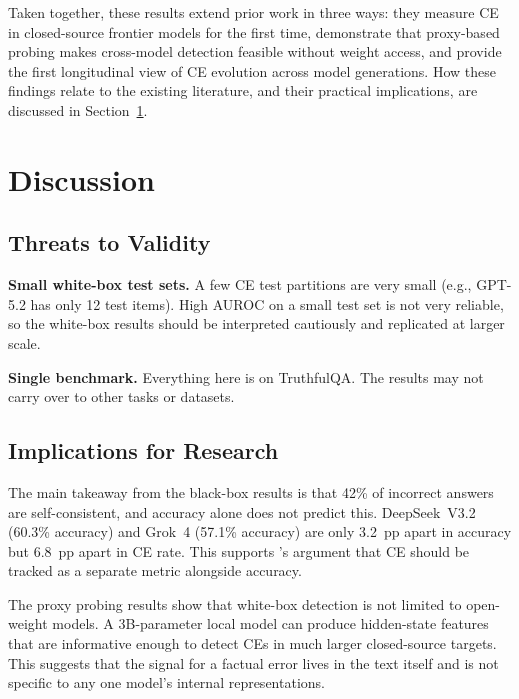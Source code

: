 \documentclass[12pt,twocolumn]{article}
\begin{document}
Taken together, these results extend prior work in three ways: they
measure CE in closed-source frontier models for the first time,
demonstrate that proxy-based probing makes cross-model detection
feasible without weight access, and provide the first longitudinal
view of CE evolution across model generations. How these findings
relate to the existing literature, and their practical implications,
are discussed in Section~\ref{sec:discussion}.

\section{Discussion}
\label{sec:discussion}

\subsection{Threats to Validity}
\label{sec:discussion-threats}

\textbf{Small white-box test sets.} A few CE test partitions are
very small (e.g., GPT-5.2 has only 12 test items). High AUROC on
a small test set is not very reliable, so the white-box results
should be interpreted cautiously and replicated at larger scale.

\textbf{Single benchmark.} Everything here is on TruthfulQA. The
results may not carry over to other tasks or datasets.

\subsection{Implications for Research}
\label{sec:discussion-research}

The main takeaway from the black-box results is that 42\% of
incorrect answers are self-consistent, and accuracy alone does not
predict this. DeepSeek~V3.2 (60.3\% accuracy) and Grok~4 (57.1\%
accuracy) are only 3.2~pp apart in accuracy but 6.8~pp apart in CE
rate. This supports \citet{tan2025consistent}'s argument that CE
should be tracked as a separate metric alongside accuracy.

The proxy probing results show that white-box detection is not
limited to open-weight models. A 3B-parameter local model can
produce hidden-state features that are informative enough to detect
CEs in much larger closed-source targets. This suggests that the
signal for a factual error lives in the text itself and is not
specific to any one model's internal representations.
\end{document}
